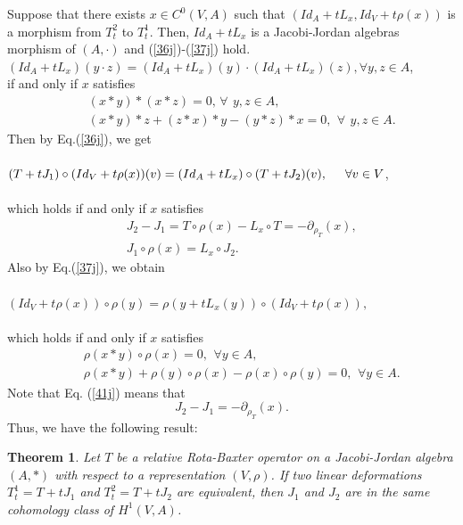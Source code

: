 \documentclass[12pt]{amsart}
\newtheorem{theorem}[Theorem]{Theorem}
\begin{document}
	Suppose that there exists $ x\in C^0(V,A) $ such that $ (Id_{A}+tL_{x},Id_{V}+t\rho(x)) $ is a morphism from $T_{t}^{2} $ to $ T_{t}^{1} $. Then,
	$ Id_{A}+tL_{x} $ is a Jacobi-Jordan algebras morphism of $ (A,\cdot) $ and (\ref{36j})-(\ref{37j}) hold.\\  
	$(Id_{A}+tL_{x})(y\cdot z)=(Id_{A}+tL_{x})(y)\cdot(Id_{A}+tL_{x})(z), \forall y,z\in A $,\\
	if and only if $ x $ satisfies
	\begin{eqnarray}
		&&(x\ast y)\ast (x\ast z)=0,   \, \forall \,\ y, z\in A,\label{39j}\\
		&&(x\ast y)\ast z+(z\ast x)\ast y-(y\ast z)\ast x=0 ,\,\ \forall\,\ y, z\in A.\label{40j}
	\end{eqnarray}
	Then by Eq.(\ref{36j}), we get \\\\
	$(T+tJ_{1})\circ(Id_{V}+t\rho(x))(v)=(Id_{A}+tL_{x})\circ(T+tJ_{2})(v),\hspace*{0.5cm}\forall v\in V$,\\\\
	which holds if and only if  $ x $ satisfies
	\begin{eqnarray}
		&&J_{2}-J_{1}= T\circ\rho(x)-L_{x}\circ T=-\partial_{\rho_{T}}(x), \label{41j}\\
		&&J_{1}\circ\rho(x)=L_{x}\circ J_{2}. \label{42j}
	\end{eqnarray}
	Also by Eq.(\ref{37j}), we obtain \\\\
	$ (Id_{V}+t\rho(x))\circ\rho(y)=\rho(y+tL_{x}(y))\circ(Id_{V}+t\rho(x)), $\\\\
	which holds if and only if $ x $ satisfies
	\begin{eqnarray}
		&&\rho(x\ast y)\circ\rho(x)=0, \,\ \forall y\in A,\label{43j}\\
		&&\rho(x\ast y)+\rho(y)\circ \rho(x)-\rho(x)\circ \rho(y)=0,\,\ \forall y\in A.\label{44j}
	\end{eqnarray}
	Note that Eq. (\ref{41j}) means that $$J_{2}-J_{1}=-\partial_{\rho_{T}}(x).$$ Thus, we have the following result:
	\begin{theorem}
		Let $T$ be a relative Rota-Baxter operator on  a Jacobi-Jordan algebra $(A,\ast)$ with
		respect to a representation $(V,\rho)$. If two linear deformations $T_{t}^1 = T +tJ_1$ and $T_{t}^2= T +tJ_2$ are equivalent, then $J_1$ and $J_2$ are in the same cohomology class of $H^1 (V,A)$.	
	\end{theorem}
\end{document}
